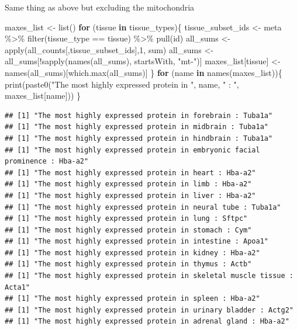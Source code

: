 \documentclass[
]{article}
\newenvironment{Shaded}{\begin{snugshade}}{\end{snugshade}}
\newcommand{\ControlFlowTok}[1]{\textcolor[rgb]{0.13,0.29,0.53}{\textbf{#1}}}
\newcommand{\DecValTok}[1]{\textcolor[rgb]{0.00,0.00,0.81}{#1}}
\newcommand{\FunctionTok}[1]{\textcolor[rgb]{0.00,0.00,0.00}{#1}}
\newcommand{\NormalTok}[1]{#1}
\newcommand{\OtherTok}[1]{\textcolor[rgb]{0.56,0.35,0.01}{#1}}
\newcommand{\SpecialCharTok}[1]{\textcolor[rgb]{0.00,0.00,0.00}{#1}}
\newcommand{\StringTok}[1]{\textcolor[rgb]{0.31,0.60,0.02}{#1}}
\begin{document}
Same thing as above but excluding the mitochondria

\begin{Shaded}
\begin{Highlighting}[]
\NormalTok{maxes\_list }\OtherTok{\textless{}{-}} \FunctionTok{list}\NormalTok{()}
\ControlFlowTok{for}\NormalTok{ (tissue }\ControlFlowTok{in}\NormalTok{ tissue\_types)\{}
\NormalTok{  tissue\_subset\_ids }\OtherTok{\textless{}{-}}\NormalTok{ meta }\SpecialCharTok{\%\textgreater{}\%} \FunctionTok{filter}\NormalTok{(tissue\_type }\SpecialCharTok{==}\NormalTok{ tissue) }\SpecialCharTok{\%\textgreater{}\%} \FunctionTok{pull}\NormalTok{(id)}
\NormalTok{  all\_sums }\OtherTok{\textless{}{-}} \FunctionTok{apply}\NormalTok{(all\_counts[,tissue\_subset\_ids],}\DecValTok{1}\NormalTok{, sum)}
\NormalTok{  all\_sums }\OtherTok{\textless{}{-}}\NormalTok{ all\_sums[}\SpecialCharTok{!}\FunctionTok{sapply}\NormalTok{(}\FunctionTok{names}\NormalTok{(all\_sums), startsWith, }\StringTok{"mt{-}"}\NormalTok{)]}
\NormalTok{  maxes\_list[tissue] }\OtherTok{\textless{}{-}} \FunctionTok{names}\NormalTok{(all\_sums)[}\FunctionTok{which.max}\NormalTok{(all\_sums)]}
\NormalTok{\}}
\ControlFlowTok{for}\NormalTok{ (name }\ControlFlowTok{in} \FunctionTok{names}\NormalTok{(maxes\_list))\{}
  \FunctionTok{print}\NormalTok{(}\FunctionTok{paste0}\NormalTok{(}\StringTok{"The most highly expressed protein in "}\NormalTok{, name, }\StringTok{" : "}\NormalTok{, maxes\_list[name]))}
\NormalTok{\}}
\end{Highlighting}
\end{Shaded}

\begin{verbatim}
## [1] "The most highly expressed protein in forebrain : Tuba1a"
## [1] "The most highly expressed protein in midbrain : Tuba1a"
## [1] "The most highly expressed protein in hindbrain : Tuba1a"
## [1] "The most highly expressed protein in embryonic facial prominence : Hba-a2"
## [1] "The most highly expressed protein in heart : Hba-a2"
## [1] "The most highly expressed protein in limb : Hba-a2"
## [1] "The most highly expressed protein in liver : Hba-a2"
## [1] "The most highly expressed protein in neural tube : Tuba1a"
## [1] "The most highly expressed protein in lung : Sftpc"
## [1] "The most highly expressed protein in stomach : Cym"
## [1] "The most highly expressed protein in intestine : Apoa1"
## [1] "The most highly expressed protein in kidney : Hba-a2"
## [1] "The most highly expressed protein in thymus : Actb"
## [1] "The most highly expressed protein in skeletal muscle tissue : Acta1"
## [1] "The most highly expressed protein in spleen : Hba-a2"
## [1] "The most highly expressed protein in urinary bladder : Actg2"
## [1] "The most highly expressed protein in adrenal gland : Hba-a2"
\end{verbatim}
\end{document}
